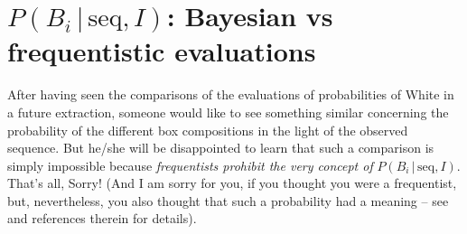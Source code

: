 \documentclass[11pt]{article}
\begin{document}
\section{$P(B_i\,|\,\mbox{seq},I)$: Bayesian vs frequentistic 
evaluations  }
After having seen the comparisons of the evaluations of probabilities of 
White in a future extraction, someone would like to see
something similar concerning the probability of the different
box compositions in the light of the observed sequence. 
But he/she will be disappointed to learn that such a comparison
is simply impossible because {\em frequentists prohibit the
very concept of} $P(B_i\,|\,\mbox{seq},I)$. That's all, 
Sorry! (And I am sorry for you, if you thought you were a frequentist,
but, nevertheless, you also thought that
such a probability had a 
meaning -- see \cite{BadMath, WavesSigmas} and references therein
for details).\\  
\mbox{} \\
\end{document}
